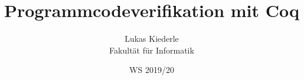 \documentclass[twoside=true, %
    DIV=15
    ,%
    BCOR=15mm, %
    headinclude=true,
    footinclude=false,
    pagesize,%
    fontsize=11pt,%
    paper=a4,%
    numbers=noenddot
  ]{scrartcl}
\begin{document}
\def\figdir{figures}
\def\tabledir{tables}

\titlehead{
\raggedleft
\texttt{[image: \\figdir/logo-th-rosenheim-2019\_master\_quer\_2c.eps]}
}

\title{
\vspace*{0cm}
Programmcodeverifikation mit Coq
}

\author{
Lukas Kiederle\\
Fakultät für Informatik}

\date{WS 2019/20}

\maketitle

\cleardoubleemptypage

\cleardoubleemptypage

\tableofcontents










\appendix





\end{document}
